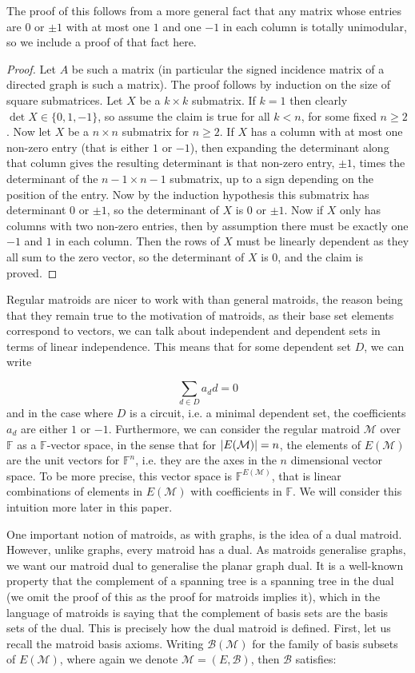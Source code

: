 \documentclass[12pt]{report}
\theoremstyle{definition}
\DeclarePairedDelimiter\abs{\lvert}{\rvert}
\def\F{\mathbb F}
\def\calB{\mathcal B}
\def\calM{\mathcal M}
\theoremstyle{upright}
\begin{document}
The proof of this follows from a more general fact that any matrix whose entries are $0$ or $\pm1$ with at most one $1$ and one $-1$ in each column is totally unimodular, so we include a proof of that fact here.

\begin{proof}

    Let $A$ be such a matrix (in particular the signed incidence matrix of a directed graph is such a matrix).
    The proof follows by induction on the size of square submatrices.
    Let $X$ be a $k\times k$ submatrix.
    If $k=1$ then clearly $\det X\in\{0, 1, -1\}$, so assume the claim is true for all $k<n$, for some fixed $n\geq2$.
    Now let $X$ be a $n\times n$ submatrix for $n\geq2$.
    If $X$ has a column with at most one non-zero entry (that is either $1$ or $-1$), then expanding the determinant along that column gives the resulting determinant is that non-zero entry, $\pm1$, times the determinant of the $n-1\times n-1$ submatrix, up to a sign depending on the position of the entry.
    Now by the induction hypothesis this submatrix has determinant $0$ or $\pm1$, so the determinant of $X$ is $0$ or $\pm1$.
    Now if $X$ only has columns with two non-zero entries, then by assumption there must be exactly one $-1$ and $1$ in each column.
    Then the rows of $X$ must be linearly dependent as they all sum to the zero vector, so the determinant of $X$ is $0$, and the claim is proved.
    
\end{proof}

Regular matroids are nicer to work with than general matroids, the reason being that they remain true to the motivation of matroids, as their base set elements correspond to vectors, we can talk about independent and dependent sets in terms of linear independence.
This means that for some dependent set $D$, we can write

\[\sum_{d\in D} a_d d=0\]
and in the case where $D$ is a circuit, i.e. a minimal dependent set, the coefficients $a_d$ are either $1$ or $-1$.
Furthermore, we can consider the regular matroid $\calM$ over $\F$ as a $\F$-vector space, in the sense that for $\abs*{E(\calM)}=n$, the elements of $E(\calM)$ are the unit vectors for $\F^n$, i.e. they are the axes in the $n$ dimensional vector space.
To be more precise, this vector space is $\F^{E(\calM)}$, that is linear combinations of elements in $E(\calM)$ with coefficients in $\F$.
We will consider this intuition more later in this paper.

One important notion of matroids, as with graphs, is the idea of a dual matroid.
However, unlike graphs, every matroid has a dual.
As matroids generalise graphs, we want our matroid dual to generalise the planar graph dual.
It is a well-known property that the complement of a spanning tree is a spanning tree in the dual (we omit the proof of this as the proof for matroids implies it), which in the language of matroids is saying that the complement of basis sets are the basis sets of the dual.
This is precisely how the dual matroid is defined.
First, let us recall the matroid basis axioms.
Writing $\calB(\calM)$ for the family of basis subsets of $E(\calM)$, where again we denote $\calM=(E, \calB)$, then $\calB$ satisfies:
\end{document}

